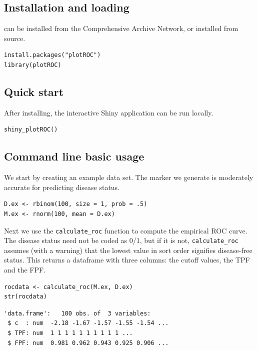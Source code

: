\documentclass[article]{jss}
\begin{document}
\subsection{Installation and loading}\label{installation-and-loading}

 can be installed from the Comprehensive 
Archive Network, or installed from source.

\begin{verbatim}
install.packages("plotROC")
library(plotROC)
\end{verbatim}

\subsection{Quick start}\label{quick-start}

After installing, the interactive Shiny application can be run locally.

\begin{verbatim}
shiny_plotROC()
\end{verbatim}

\subsection{Command line basic usage}\label{command-line-basic-usage}

We start by creating an example data set. The marker we generate is
moderately accurate for predicting disease status.

\begin{verbatim}
D.ex <- rbinom(100, size = 1, prob = .5)
M.ex <- rnorm(100, mean = D.ex)
\end{verbatim}

Next we use the \texttt{calculate\_roc} function to compute the
empirical ROC curve. The disease status need not be coded as 0/1, but if
it is not, \texttt{calculate\_roc} assumes (with a warning) that the
lowest value in sort order signifies disease-free status. This returns a
dataframe with three columns: the cutoff values, the TPF and the FPF.

\begin{verbatim}
rocdata <- calculate_roc(M.ex, D.ex)
str(rocdata)
\end{verbatim}

\begin{verbatim}
'data.frame':   100 obs. of  3 variables:
 $ c  : num  -2.18 -1.67 -1.57 -1.55 -1.54 ...
 $ TPF: num  1 1 1 1 1 1 1 1 1 1 ...
 $ FPF: num  0.981 0.962 0.943 0.925 0.906 ...
\end{verbatim}
\end{document}
